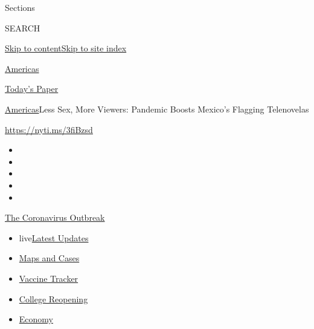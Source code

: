 Sections

SEARCH

\protect\hyperlink{site-content}{Skip to
content}\protect\hyperlink{site-index}{Skip to site index}

\href{https://www.nytimes3xbfgragh.onion/section/world/americas}{Americas}

\href{https://myaccount.nytimes3xbfgragh.onion/auth/login?response_type=cookie\&client_id=vi}{}

\href{https://www.nytimes3xbfgragh.onion/section/todayspaper}{Today's
Paper}

\href{/section/world/americas}{Americas}\textbar{}Less Sex, More
Viewers: Pandemic Boosts Mexico's Flagging Telenovelas

\url{https://nyti.ms/3fiBzsd}

\begin{itemize}
\item
\item
\item
\item
\item
\end{itemize}

\href{https://www.nytimes3xbfgragh.onion/news-event/coronavirus?action=click\&pgtype=Article\&state=default\&region=TOP_BANNER\&context=storylines_menu}{The
Coronavirus Outbreak}

\begin{itemize}
\tightlist
\item
  live\href{https://www.nytimes3xbfgragh.onion/2020/08/04/world/coronavirus-cases.html?action=click\&pgtype=Article\&state=default\&region=TOP_BANNER\&context=storylines_menu}{Latest
  Updates}
\item
  \href{https://www.nytimes3xbfgragh.onion/interactive/2020/us/coronavirus-us-cases.html?action=click\&pgtype=Article\&state=default\&region=TOP_BANNER\&context=storylines_menu}{Maps
  and Cases}
\item
  \href{https://www.nytimes3xbfgragh.onion/interactive/2020/science/coronavirus-vaccine-tracker.html?action=click\&pgtype=Article\&state=default\&region=TOP_BANNER\&context=storylines_menu}{Vaccine
  Tracker}
\item
  \href{https://www.nytimes3xbfgragh.onion/2020/08/02/us/covid-college-reopening.html?action=click\&pgtype=Article\&state=default\&region=TOP_BANNER\&context=storylines_menu}{College
  Reopening}
\item
  \href{https://www.nytimes3xbfgragh.onion/live/2020/08/04/business/stock-market-today-coronavirus?action=click\&pgtype=Article\&state=default\&region=TOP_BANNER\&context=storylines_menu}{Economy}
\end{itemize}

